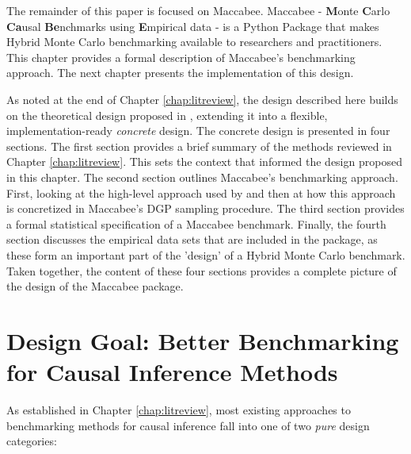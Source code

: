 \documentclass[../main.tex]{subfiles}
\begin{document}

The remainder of this paper is focused on Maccabee. Maccabee - \textbf{M}onte \textbf{C}arlo \textbf{Ca}usal \textbf{Be}nchmarks using \textbf{E}mpirical data - is a Python Package that makes Hybrid Monte Carlo benchmarking available to researchers and practitioners. This chapter provides a formal description of Maccabee's benchmarking approach. The next chapter presents the implementation of this design.

\vspace{\baselineskip}

As noted at the end of Chapter \ref{chap:litreview}, the design described here builds on the theoretical design proposed in \textcite{Dorie2019Automated1}, extending it into a flexible, implementation-ready \textit{concrete} design. The concrete design is presented in four sections. The first section provides a brief summary of the methods reviewed in Chapter \ref{chap:litreview}. This sets the context that informed the design proposed in this chapter. The second section outlines Maccabee's benchmarking approach. First, looking at the high-level approach used by \textcite{Dorie2019Automated1} and then at how this approach is concretized in Maccabee's DGP sampling procedure. The third section provides a formal statistical specification of a Maccabee benchmark. Finally, the fourth section discusses the empirical data sets that are included in the package, as these form an important part of the 'design' of a Hybrid Monte Carlo benchmark. Taken together, the content of these four sections provides a complete picture of the design of the Maccabee package.

\section{Design Goal: Better Benchmarking for Causal Inference Methods}
\label{mac:problems}

As established in Chapter \ref{chap:litreview}, most existing approaches to benchmarking methods for causal inference fall into one of two \textit{pure} design categories:
\end{document}
